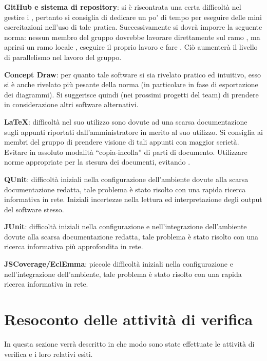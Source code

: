 \begin{description}
	\item \textbf{GitHub e sistema di repository}: si è riscontrata una certa difficoltà nel gestire i , pertanto si consiglia di dedicare un po' di tempo per eseguire delle mini esercitazioni nell'uso di tale pratica. Successivamente si dovrà imporre la seguente norma: nessun membro del gruppo dovrebbe lavorare direttamente sul ramo , ma aprirsi un ramo locale , eseguire il proprio lavoro e fare . Ciò aumenterà il livello di parallelismo nel lavoro del gruppo.
	\item \textbf{Concept Draw}: per quanto tale software si sia rivelato pratico ed intuitivo, esso si è anche rivelato più pesante della norma (in particolare in fase di esportazione dei diagrammi).  Si suggerisce quindi (nei prossimi progetti del team) di prendere in considerazione altri software alternativi.
	\item \textbf{LaTeX}: difficoltà nel suo utilizzo sono dovute ad una scarsa documentazione sugli appunti riportati dall'amministratore in merito al suo utilizzo. Si consiglia ai membri del gruppo di prendere visione di tali appunti con maggior serietà. Evitare in assoluto modalità ``copia-incolla'' di parti di documento. Utilizzare norme appropriate  per la stesura dei documenti, evitando .
	\item \textbf{QUnit}: difficoltà iniziali nella configurazione dell'ambiente dovute alla scarsa documentazione redatta, tale problema è stato risolto con una rapida ricerca informativa in rete. Iniziali incertezze nella lettura ed interpretazione degli output del software stesso.
	\item \textbf{JUnit}: difficoltà iniziali nella configurazione e nell'integrazione dell'ambiente dovute alla scarsa documentazione redatta, tale problema è stato risolto con una ricerca informativa più approfondita in rete.
	\item \textbf{JSCoverage/EclEmma}: piccole difficoltà iniziali nella configurazione e nell'integrazione dell'ambiente, tale problema è stato risolto con una rapida ricerca informativa in rete.
\end{description}
\clearpage

\section{Resoconto delle attività di verifica}
In questa sezione verrà descritto in che modo sono state effettuate le attività di verifica e i loro relativi esiti.

